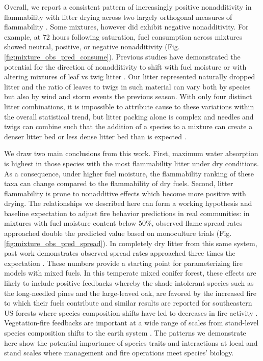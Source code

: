 \documentclass[letterpaper,12pt]{article}
\begin{document}
Overall, we report a consistent pattern of increasingly positive nonadditivity
in flammability with litter drying across two largely orthogonal measures of
flammability \citep{Schwilk-2015, Pausas+Keeley+etal-2017,
  Prior+Murphy+etal-2018}. Some mixtures, however did exhibit negative
nonadditivity. For example, at 72 hours following saturation, fuel consumption
across mixtures showed neutral, positive, or negative nonadditivity (Fig.
\ref{fig:mixture_obs_pred_consume}). Previous studies have demonstrated the
potential for the direction of nonadditivity to shift with fuel moisture
\citep{Blauw+Wensink+etal-2015} or with altering mixtures of leaf vs twig
litter \citep{Zhao+vanLogtestijn+etal-2019}. Our litter represented naturally
dropped litter and the ratio of leaves to twigs in such material can vary both
by species but also by wind and storm events the previous season. With only
four distinct litter combinations, it is impossible to attribute cause to these
variations within the overall statistical trend, but litter packing alone is
complex and needles and twigs can combine such that the addition of a species
to a mixture can create a denser litter bed or less dense litter bed than is
expected \citep{Zhao+vanLogtestijn+etal-2019}.


We draw two main conclusions from this work. First, maximum water absorption is
highest in those species with the most flammability litter under dry conditions.
As a consequence, under higher fuel moisture, the flammability ranking of
these taxa can change compared to the flammability of dry fuels. Second, litter
flammability is prone to nonadditive effects which become more positive with
drying. The relationships we described here can form a working hypothesis and
baseline expectation to adjust fire behavior predictions in real communities:
in mixtures with fuel moisture content below 50\%, observed flame spread rates
approached double the predicted value based on monoculture trials (Fig.
\ref{fig:mixture_obs_pred_spread}). In completely dry litter from this same
system, past work demonstrates observed spread rates approached three times the
expectation \citep{Magalhaes+Schwilk-2012}. These numbers provide a starting
point for parameterizing fire models with mixed fuels. In this temperate mixed
conifer forest, these effects are likely to include positive feedbacks whereby
the shade intolerant species such as the long-needled pines and the
large-leaved oak, are favored by the increased fire to which their fuels
contribute \citep{Schwilk+Caprio-2011} and similar results are reported for
southeastern US forests where species composition shifts have led to decreases
in fire activity \citep{Nowacki+Abrams-2008}. Vegetation-fire feedbacks are
important at a wide range of scales from stand-level species composition shifts
to the earth system \citep{Harris+Remenyi+etal-2016,
  Archibald+Lehmann+etal-2018}. The patterns we demonstrate here show the
potential importance of species traits and interactions at local and stand
scales where management and fire operations meet species' biology.
\end{document}
